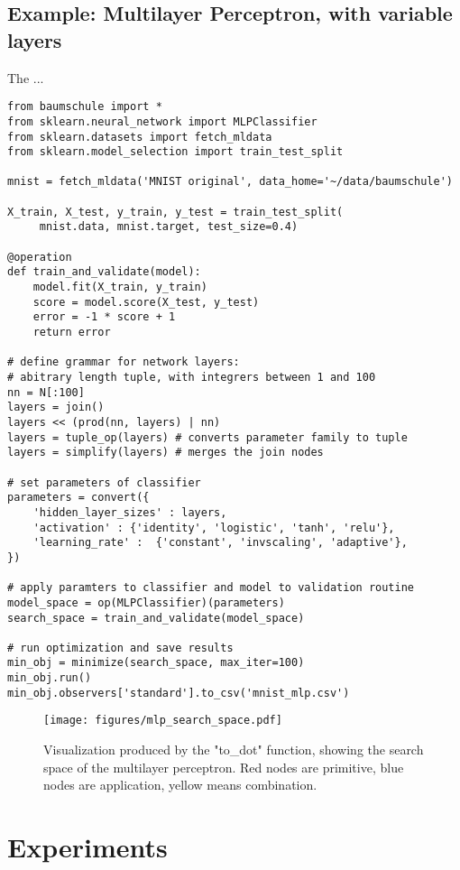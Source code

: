 \documentclass[english]{article}
\begin{document}
\subsection{Example: Multilayer Perceptron, with variable layers}
The ...


\begin{verbatim}
from baumschule import *
from sklearn.neural_network import MLPClassifier
from sklearn.datasets import fetch_mldata
from sklearn.model_selection import train_test_split

mnist = fetch_mldata('MNIST original', data_home='~/data/baumschule')

X_train, X_test, y_train, y_test = train_test_split(
     mnist.data, mnist.target, test_size=0.4)

@operation
def train_and_validate(model):
    model.fit(X_train, y_train)
    score = model.score(X_test, y_test)
    error = -1 * score + 1
    return error

# define grammar for network layers:
# abitrary length tuple, with integrers between 1 and 100
nn = N[:100]
layers = join()
layers << (prod(nn, layers) | nn)
layers = tuple_op(layers) # converts parameter family to tuple
layers = simplify(layers) # merges the join nodes

# set parameters of classifier
parameters = convert({
    'hidden_layer_sizes' : layers,
    'activation' : {'identity', 'logistic', 'tanh', 'relu'},
    'learning_rate' :  {'constant', 'invscaling', 'adaptive'},
})

# apply paramters to classifier and model to validation routine
model_space = op(MLPClassifier)(parameters)
search_space = train_and_validate(model_space)

# run optimization and save results
min_obj = minimize(search_space, max_iter=100)
min_obj.run()
min_obj.observers['standard'].to_csv('mnist_mlp.csv')

\end{verbatim}

\begin{figure}
  \texttt{[image: figures/mlp\_search\_space.pdf]}
  \caption{Visualization produced by the "to\_dot" function, showing the search space of the multilayer perceptron. Red nodes are primitive, blue nodes are application, yellow means combination.}
  \label{mlp_search_space}
\end{figure}


\section{Experiments}
\end{document}
